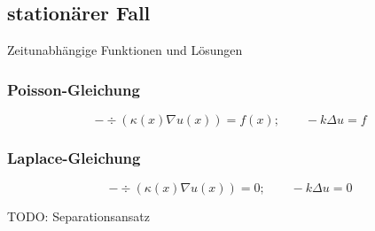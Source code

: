 \subsection{stationärer Fall}
Zeitunabhängige Funktionen und Lösungen
\subsubsection{Poisson-Gleichung}
\begin{emphbox}
    \begin{equation*}
        -\div(\kappa(x)\nabla u(x)) = f(x); \qquad -k\Delta u = f
    \end{equation*}
\end{emphbox}

\subsubsection{Laplace-Gleichung}
\begin{emphbox}
    \begin{equation*}
        -\div(\kappa(x)\nabla u(x)) = 0; \qquad -k\Delta u = 0
    \end{equation*}
\end{emphbox}

TODO: Separationsansatz

